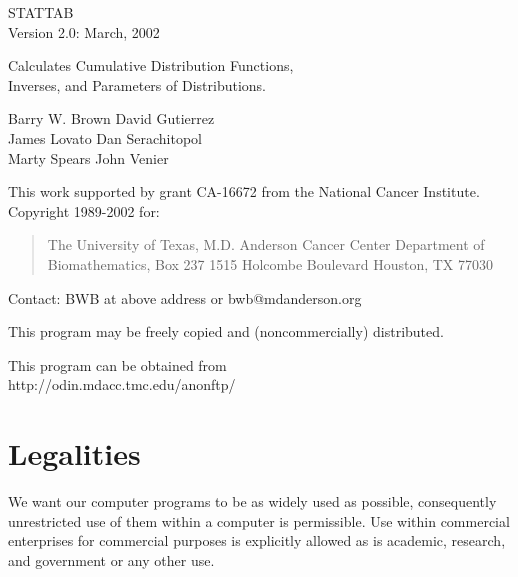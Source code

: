 \documentclass[12pt,dvips]{article}
\newcommand{\mysection}[1]
    {\color{blue} \section{#1} \color{black}}
\newcommand{\vs}{\vspace*{\fill}}
\begin{document}
\Large \bfseries
     
{\centering \color{blue}     
                                    STATTAB\\
                          Version 2.0: March, 2002\\
\vspace{0.1in}


     Calculates Cumulative Distribution Functions,\\
               Inverses, and Parameters of Distributions.\\

\vspace{0.1in}

}



{\centering \color{green}
                  Barry W. Brown  \hfill             David Gutierrez\\
                  James Lovato    \hfill            Dan Serachitopol\\
                  Marty Spears    \hfill            John Venier\\}

\vs

     This  work supported  by   grant CA-16672   from the  National  Cancer
     Institute.\\

  Copyright 1989-2002 for:
\begin{quote}            
         The University of Texas, M.D. Anderson Cancer Center
                    Department of Biomathematics, Box 237
                    1515 Holcombe Boulevard
                    Houston, TX      77030
\end{quote}
     Contact: BWB at above address or bwb@mdanderson.org

     This program may be freely copied and (noncommercially) distributed.

     This program can be obtained from\\
{\centering http://odin.mdacc.tmc.edu/anonftp/}

\normalsize \normalfont

\vs

\pagebreak

\mysection{Legalities}

We   want our  computer  programs to  be  as  widely used as possible,
consequently    unrestricted  use   of  them  within     a computer is
permissible.    Use   within commercial  enterprises   for  commercial
purposes  is explicitly allowed   as    is academic, research,     and
government or any other use.  
\end{document}
